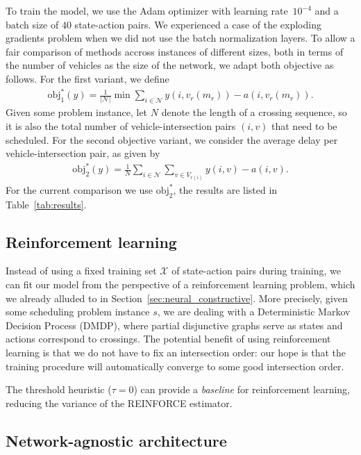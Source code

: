 \documentclass[a4paper]{article}
\theoremstyle{definition}
\theoremstyle{plain}
\begin{document}
To train the model, we use the Adam optimizer with learning rate~$10^{-4}$ and a
batch size of $40$ state-action pairs. We experienced a case of the exploding
gradients problem when we did not use the batch normalization layers. To allow a fair comparison of methods accross instances of different
sizes, both in terms of the number of vehicles as the size of the network, we
adapt both objective as follows.
For the first variant, we define
\begin{align*}
  \text{obj}_{1}^{*}(y) = \frac{1}{|\mathcal{N}|}\min \sum_{i \in \mathcal{N}} y(i, v_{r}(m_{r})) - a(i, v_{r}(m_{r})) .
\end{align*}
Given some problem instance, let $N$ denote the length of a crossing sequence,
so it is also the total number of vehicle-intersection pairs $(i, v)$ that need
to be scheduled. For the second objective variant, we consider the average delay
per vehicle-intersection pair, as given by
\begin{align*}
  \text{obj}_{2}^{*}(y) = \frac{1}{N} \sum_{i \in \mathcal{N}} \sum_{v \in V_{r(i)}} y(i, v) - a(i, v) .
\end{align*}
For the current comparison we use $\text{obj}_{2}^{*}$, the results are listed
in Table~\ref{tab:results}.




\subsection{Reinforcement learning}

Instead of using a fixed training set $\mathcal{X}$ of state-action pairs during
training, we can fit our model from the perspective of a reinforcement learning
problem, which we already alluded to in Section~\ref{sec:neural_constructive}.
%
More precisely, given some scheduling problem instance $s$, we are dealing with
a Deterministic Markov Decision Process (DMDP), where partial disjunctive graphs
serve as states and actions correspond to crossings.
%
The potential benefit of using reinforcement learning is that we do not have to
fix an intersection order: our hope is that the training procedure will
automatically converge to some good intersection order.

{\color{Navy} The threshold heuristic ($\tau = 0$) can provide a
  \textit{baseline} for reinforcement learning, reducing the variance of the
  REINFORCE estimator.}

\newpage
\subsection{Network-agnostic architecture}
\end{document}
